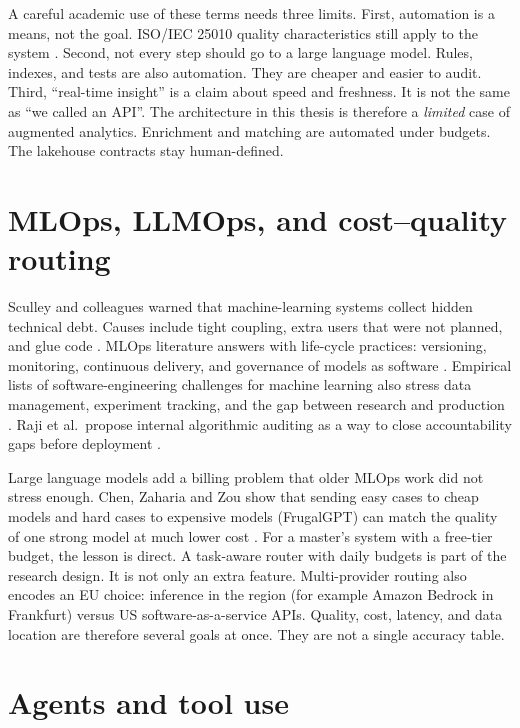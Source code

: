 A careful academic use of these terms needs three limits. First, automation is a means, not the goal. ISO/IEC 25010 quality characteristics still apply to the system . Second, not every step should go to a large language model. Rules, indexes, and tests are also automation. They are cheaper and easier to audit. Third, ``real-time insight'' is a claim about speed and freshness. It is not the same as ``we called an API''. The architecture in this thesis is therefore a \emph{limited} case of augmented analytics. Enrichment and matching are automated under budgets. The lakehouse contracts stay human-defined.

\section{MLOps, LLMOps, and cost--quality routing}
\label{sec:llmops}

Sculley and colleagues warned that machine-learning systems collect hidden technical debt. Causes include tight coupling, extra users that were not planned, and glue code . MLOps literature answers with life-cycle practices: versioning, monitoring, continuous delivery, and governance of models as software . Empirical lists of software-engineering challenges for machine learning also stress data management, experiment tracking, and the gap between research and production . Raji et al.\ propose internal algorithmic auditing as a way to close accountability gaps before deployment .

Large language models add a billing problem that older MLOps work did not stress enough. Chen, Zaharia and Zou show that sending easy cases to cheap models and hard cases to expensive models (FrugalGPT) can match the quality of one strong model at much lower cost . For a master's system with a free-tier budget, the lesson is direct. A task-aware router with daily budgets is part of the research design. It is not only an extra feature. Multi-provider routing also encodes an EU choice: inference in the region (for example Amazon Bedrock in Frankfurt) versus US software-as-a-service APIs. Quality, cost, latency, and data location are therefore several goals at once. They are not a single accuracy table.

\section{Agents and tool use}
\label{sec:agents}


